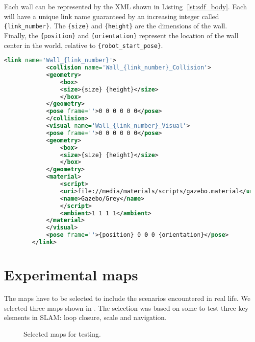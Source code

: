 Each wall can be represented by the XML shown in Listing~\ref{lst:sdf_body}. Each will have a unique link name guaranteed by an increasing integer called \texttt{\{link\_number\}}. The \texttt{\{size\}} and \texttt{\{height\}} are the dimensions of the wall. Finally, the \texttt{\{position\}} and \texttt{\{orientation\}} represent the location of the wall center in the world, relative to \texttt{\{robot\_start\_pose\}}.

\begin{lstlisting}[caption={SDF for a single wall.},label={lst:sdf_body},language=XML]
        <link name='Wall_{link_number}'>
            <collision name='Wall_{link_number}_Collision'>
            <geometry>
                <box>
                <size>{size} {height}</size>
                </box>
            </geometry>
            <pose frame=''>0 0 0 0 0 0</pose>
            </collision>
            <visual name='Wall_{link_number}_Visual'>
            <pose frame=''>0 0 0 0 0 0</pose>
            <geometry>
                <box>
                <size>{size} {height}</size>
                </box>
            </geometry>
            <material>
                <script>
                <uri>file://media/materials/scripts/gazebo.material</uri>
                <name>Gazebo/Grey</name>
                </script>
                <ambient>1 1 1 1</ambient>
            </material>
            </visual>
            <pose frame=''>{position} 0 0 0 {orientation}</pose>
        </link>
\end{lstlisting}

\section{Experimental maps}\label{sec:selecting_maps}

The maps have to be selected to include the scenarios encountered in real life. We selected three maps shown in . The selection was based on some to test three key elements in SLAM: loop closure, scale and navigation.

\begin{figure}[!ht]
     \centering
     \caption{Selected maps for testing.}
     \label{fig:generated_maps}
\end{figure}

